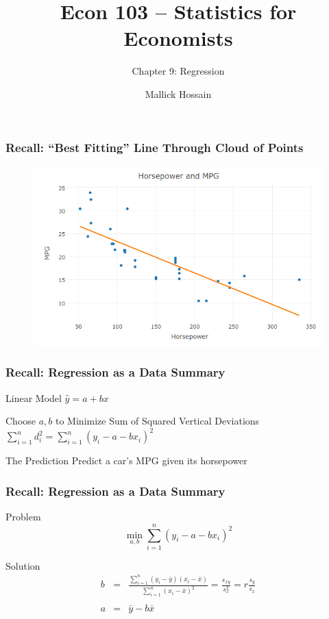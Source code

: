 \documentclass{beamer}
\title{Econ 103 -- Statistics for Economists}
\subtitle{Chapter 9: Regression}
\author{Mallick Hossain}
\date{}
\institute{University of Pennsylvania}
\begin{document}
 

\begin{frame}
	\titlepage 
	

\end{frame} 

\begin{frame}
\frametitle{Recall: ``Best Fitting'' Line Through Cloud of Points}
\begin{figure}
	\includegraphics[scale = 0.4]{./images/carsFitted2}
\end{figure}
\end{frame}
\begin{frame}
\frametitle{Recall: Regression as a Data Summary}
\begin{block}{Linear Model}
$\hat{y} = a + b x$
\end{block}
\begin{block}{Choose $a,b$ to Minimize Sum of Squared Vertical Deviations}
$\displaystyle\sum_{i = 1}^n d_i^2 = \sum_{i=1}^n (y_i - a - b x_i)^2$
\end{block}

\begin{block}{The Prediction}
Predict a car's MPG given its horsepower
\end{block}

\end{frame}
\begin{frame}
\frametitle{Recall: Regression as a Data Summary}
	\begin{block}{Problem}
	$$\min_{a,b}  \sum_{i=1}^n (y_i - a - b x_i)^2$$
\end{block}
\begin{block}{Solution}
	\begin{eqnarray*}
		b &=& \frac{\sum_{i=1}^n \left(y_i - \bar{y}\right)\left(x_i - \bar{x} \right)}{\sum_{i=1}^n \left(x_i - \bar{x}\right)^2} = \frac{s_{xy}}{s_x^2} =  r\frac{s_y}{s_x}\\ \\
		a &=& \bar{y} - b\bar{x}
	\end{eqnarray*}
\end{block}
\end{frame}
\end{document}
